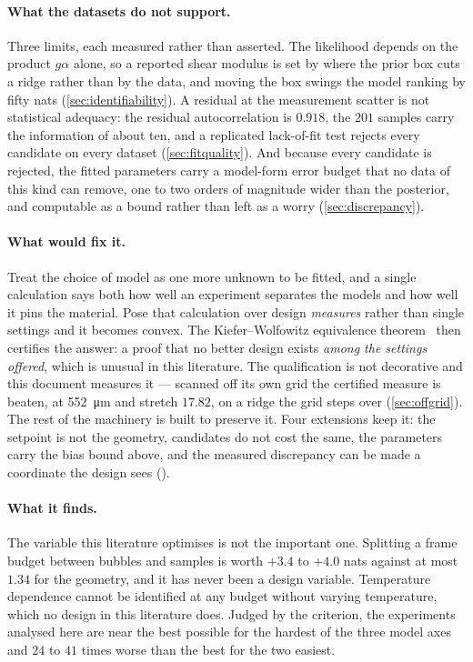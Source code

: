 \documentclass[10pt]{article}
\begin{document}
\paragraph{What the datasets do not support.} Three limits, each measured rather than asserted.
The likelihood depends on the product $g\alpha$ alone, so a reported shear modulus is set by
where the prior box cuts a ridge rather than by the data, and moving the box swings the model
ranking by fifty nats (\cref{sec:identifiability}). A residual at the measurement scatter is not
statistical adequacy: the residual autocorrelation is $0.918$, the $201$ samples carry the
information of about ten, and a replicated lack-of-fit test rejects every candidate on every
dataset (\cref{sec:fitquality}). And because every candidate is rejected, the fitted parameters
carry a model-form error budget that no data of this kind can remove, one to two orders of
magnitude wider than the posterior, and computable as a bound rather than left as a worry
(\cref{sec:discrepancy}).

\paragraph{What would fix it.} Treat the choice of model as one more unknown to be fitted, and a
single calculation says both how well an experiment separates the models and how well it pins the
material. Pose that calculation over design \emph{measures} rather than single settings and it
becomes convex. The Kiefer--Wolfowitz equivalence theorem~\citep{kiefer1960equivalence} then
certifies the answer: a proof that no better design exists \emph{among the settings offered},
which is unusual in this literature. The qualification is not decorative and this document
measures it --- scanned off its own grid the certified measure is beaten, at
\SI{552}{\micro\metre} and stretch $17.82$, on a ridge the grid steps over (\cref{sec:offgrid}).
The rest of the machinery is built to preserve it. Four extensions keep it:
the setpoint is not the geometry, candidates do not cost the same, the parameters carry the bias
bound above, and the measured discrepancy can be made a coordinate the design sees
().

\paragraph{What it finds.} The variable this literature optimises is not the important one.
Splitting a frame budget between bubbles and samples is worth $+3.4$ to $+4.0$ nats against at
most $1.34$ for the geometry, and it has never been a design variable. Temperature dependence
cannot be identified at any budget without varying temperature, which no design in this
literature does. Judged by the criterion, the experiments analysed here are near the best
possible for the hardest of the three model axes and $24$ to $41$ times worse than the best for
the two easiest.
\end{document}
